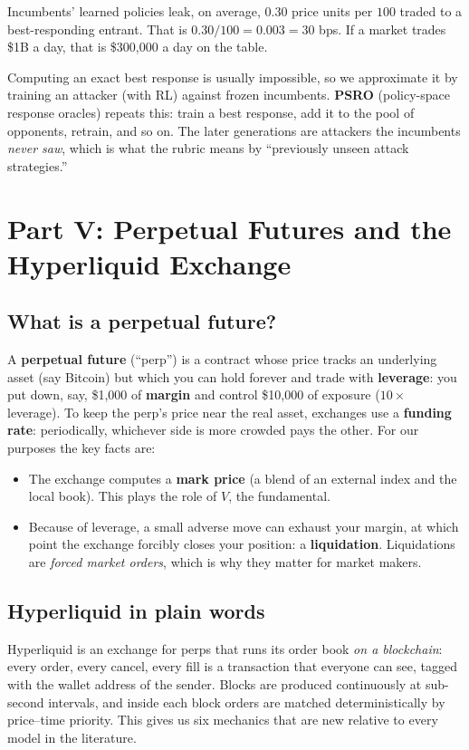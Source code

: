 \documentclass[11pt]{article}
\begin{document}
\begin{example}
Incumbents' learned policies leak, on average, $0.30$ price units per $100$ traded to a best-responding entrant. That is $0.30/100=0.003=30$ bps. If a market trades \$1B a day, that is \$300{,}000 a day on the table.
\end{example}

Computing an exact best response is usually impossible, so we approximate it by training an attacker (with RL) against frozen incumbents. \textbf{PSRO} (policy-space response oracles) repeats this: train a best response, add it to the pool of opponents, retrain, and so on. The later generations are attackers the incumbents \emph{never saw}, which is what the rubric means by ``previously unseen attack strategies.''

\section{Part V: Perpetual Futures and the Hyperliquid Exchange}

\subsection{What is a perpetual future?}
A \textbf{perpetual future} (``perp'') is a contract whose price tracks an underlying asset (say Bitcoin) but which you can hold forever and trade with \textbf{leverage}: you put down, say, \$1{,}000 of \textbf{margin} and control \$10{,}000 of exposure ($10\times$ leverage). To keep the perp's price near the real asset, exchanges use a \textbf{funding rate}: periodically, whichever side is more crowded pays the other. For our purposes the key facts are:
\begin{itemize}
\item The exchange computes a \textbf{mark price} (a blend of an external index and the local book). This plays the role of $V$, the fundamental.
\item Because of leverage, a small adverse move can exhaust your margin, at which point the exchange forcibly closes your position: a \textbf{liquidation}. Liquidations are \emph{forced market orders}, which is why they matter for market makers.
\end{itemize}

\subsection{Hyperliquid in plain words}
Hyperliquid is an exchange for perps that runs its order book \emph{on a blockchain}: every order, every cancel, every fill is a transaction that everyone can see, tagged with the wallet address of the sender. Blocks are produced continuously at sub-second intervals, and inside each block orders are matched deterministically by price--time priority. This gives us six mechanics that are new relative to every model in the literature.
\end{document}
